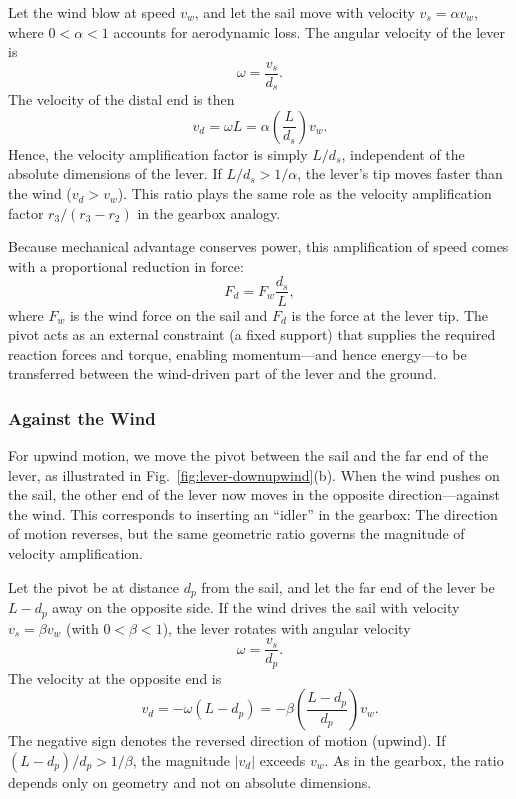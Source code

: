 \documentclass[reprint,aps,pra,longbibliography]{revtex4-2}
\begin{document}
Let the wind blow at speed $v_w$, and let the sail move with velocity $v_s = \alpha v_w$, where $0 < \alpha < 1$ accounts for aerodynamic loss. The angular velocity of the lever is
\begin{equation}
\omega = \frac{v_s}{d_s}.
\end{equation}
The velocity of the distal end is then
\begin{equation}
v_d = \omega L = \alpha \left(\frac{L}{d_s}\right) v_w.
\end{equation}
Hence, the velocity amplification factor is simply $L/d_s$, independent of the absolute dimensions of the lever. If $L/d_s > 1/\alpha$, the lever's tip moves faster than the wind ($v_d > v_w$).
This ratio plays the same role as the velocity amplification factor
$r_3/(r_3 - r_2)$ in the gearbox analogy.

Because mechanical advantage conserves power, this amplification of speed comes with a proportional reduction in force:
\begin{equation}
F_d = F_w \frac{d_s}{L},
\end{equation}
where $F_w$ is the wind force on the sail and $F_d$ is the force at the lever tip. The pivot acts as an external constraint (a fixed support) that supplies the required reaction forces and torque, enabling momentum---and hence energy---to be transferred between the wind-driven part of the lever and the ground.

\subsubsection{Against the Wind}

For upwind motion, we move the pivot between the sail and the far end of the lever, as illustrated in Fig.~\ref{fig:lever-downupwind}(b). When the wind pushes on the sail, the other end of the lever now moves in the opposite direction---against the wind. This corresponds to inserting an ``idler'' in the gearbox: The direction of motion reverses, but the same geometric ratio governs the magnitude of velocity amplification.

Let the pivot be at distance $d_p$ from the sail, and let the far end of the lever be $L - d_p$ away on the opposite side. If the wind drives the sail with velocity $v_s = \beta v_w$ (with $0 < \beta < 1$), the lever rotates with angular velocity
\begin{equation}
\omega = \frac{v_s}{d_p}.
\end{equation}
The velocity at the opposite end is
\begin{equation}
v_d = -\omega (L - d_p) = -\beta \left(\frac{L - d_p}{d_p}\right) v_w.
\end{equation}
The negative sign denotes the reversed direction of motion (upwind). If $(L - d_p)/d_p > 1/\beta$, the magnitude $|v_d|$ exceeds $v_w$. As in the gearbox, the ratio depends only on geometry and not on absolute dimensions.
\end{document}
